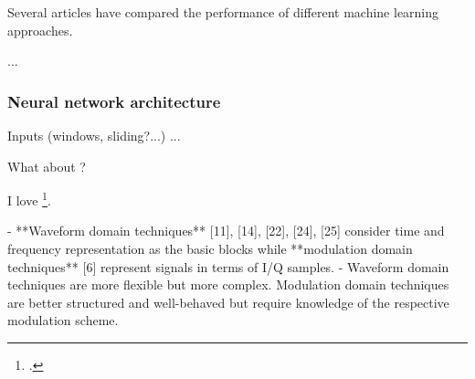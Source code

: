 Several articles have compared the performance of different machine learning approaches.

...

\subsubsection{Neural network architecture}

Inputs (windows, sliding?...)
...


What about \parencite[pre][page 2]{youssef_machine_2017}?

I love \footcite[pre][post]{stankowicz_complex_2019}.


- **Waveform domain techniques** [11], [14], [22], [24], [25] consider time and frequency representation as the basic blocks while **modulation domain techniques** [6] represent signals in terms of I/Q samples.
- Waveform domain techniques are more flexible but more complex. Modulation domain techniques are better structured and well-behaved but require knowledge of the respective modulation scheme.

